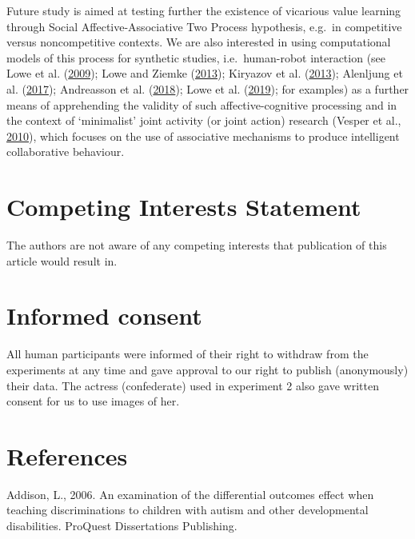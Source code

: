 \documentclass[]{elsarticle} %
\begin{document}
Future study is aimed at testing further the existence of vicarious
value learning through Social Affective-Associative Two Process
hypothesis, e.g.~in competitive versus noncompetitive contexts. We are
also interested in using computational models of this process for
synthetic studies, i.e.~human-robot interaction (see Lowe et al.
(\protect\hyperlink{ref-lowe2009dual}{2009}); Lowe and Ziemke
(\protect\hyperlink{ref-lowe2013exploring}{2013}); Kiryazov et al.
(\protect\hyperlink{ref-kiryazov2013role}{2013}); Alenljung et al.
(\protect\hyperlink{ref-alenljung2017user}{2017}); Andreasson et al.
(\protect\hyperlink{ref-andreasson2018affective}{2018}); Lowe et al.
(\protect\hyperlink{ref-lowe2019vicarious}{2019}); for examples) as a
further means of apprehending the validity of such affective-cognitive
processing and in the context of `minimalist' joint activity (or joint
action) research (Vesper et al.,
\protect\hyperlink{ref-vesper2010minimal}{2010}), which focuses on the
use of associative mechanisms to produce intelligent collaborative
behaviour.

\hypertarget{competing-interests-statement}{%
\section{Competing Interests
Statement}\label{competing-interests-statement}}

The authors are not aware of any competing interests that publication of
this article would result in.

\hypertarget{informed-consent}{%
\section{Informed consent}\label{informed-consent}}

All human participants were informed of their right to withdraw from the
experiments at any time and gave approval to our right to publish
(anonymously) their data. The actress (confederate) used in experiment 2
also gave written consent for us to use images of her.

\hypertarget{references}{%
\section*{References}\label{references}}

\begingroup
\setlength{\parindent}{-0.5in}
\setlength{\leftskip}{0.5in}

\hypertarget{refs}{}
\leavevmode\hypertarget{ref-addison_examination_2006}{}%
Addison, L., 2006. An examination of the differential outcomes effect
when teaching discriminations to children with autism and other
developmental disabilities. ProQuest Dissertations Publishing.
\end{document}
